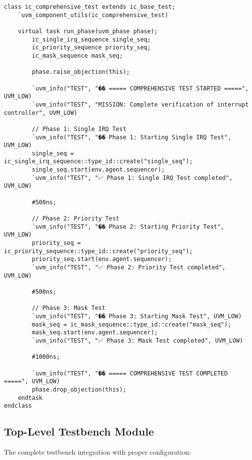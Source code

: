 \documentclass[12pt,a4paper]{article}
\begin{document}
\begin{lstlisting}[caption=Comprehensive Test Implementation, label=lst:comprehensive_test]
class ic_comprehensive_test extends ic_base_test;
    `uvm_component_utils(ic_comprehensive_test)
    
    virtual task run_phase(uvm_phase phase);
        ic_single_irq_sequence single_seq;
        ic_priority_sequence priority_seq;
        ic_mask_sequence mask_seq;
        
        phase.raise_objection(this);
        
        `uvm_info("TEST", "�� ===== COMPREHENSIVE TEST STARTED =====", UVM_LOW)
        `uvm_info("TEST", "MISSION: Complete verification of interrupt controller", UVM_LOW)
        
        // Phase 1: Single IRQ Test
        `uvm_info("TEST", "�� Phase 1: Starting Single IRQ Test", UVM_LOW)
        single_seq = ic_single_irq_sequence::type_id::create("single_seq");
        single_seq.start(env.agent.sequencer);
        `uvm_info("TEST", "✅ Phase 1: Single IRQ Test completed", UVM_LOW)
        
        #500ns;
        
        // Phase 2: Priority Test
        `uvm_info("TEST", "�� Phase 2: Starting Priority Test", UVM_LOW)
        priority_seq = ic_priority_sequence::type_id::create("priority_seq");
        priority_seq.start(env.agent.sequencer);
        `uvm_info("TEST", "✅ Phase 2: Priority Test completed", UVM_LOW)
        
        #500ns;
        
        // Phase 3: Mask Test
        `uvm_info("TEST", "�� Phase 3: Starting Mask Test", UVM_LOW)
        mask_seq = ic_mask_sequence::type_id::create("mask_seq");
        mask_seq.start(env.agent.sequencer);
        `uvm_info("TEST", "✅ Phase 3: Mask Test completed", UVM_LOW)
        
        #1000ns;
        
        `uvm_info("TEST", "�� ===== COMPREHENSIVE TEST COMPLETED =====", UVM_LOW)
        phase.drop_objection(this);
    endtask
endclass
\end{lstlisting}

\subsection{Top-Level Testbench Module}
The complete testbench integration with proper configuration:
\end{document}
